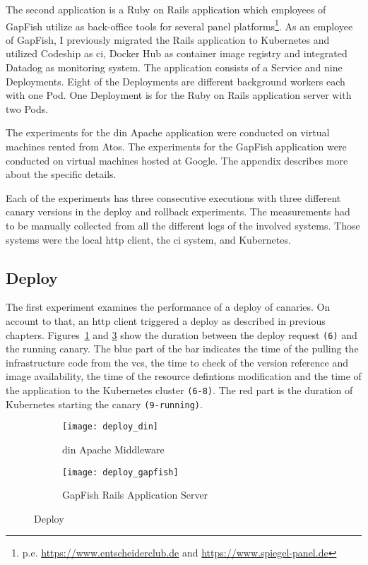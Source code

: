The second application is a Ruby on Rails application which employees of GapFish utilize
as back-office tools for several panel
platforms\footnote{p.e. \url{https://www.entscheiderclub.de} and
  \url{https://www.spiegel-panel.de}}. As an employee of GapFish, I previously migrated the
Rails application to Kubernetes and utilized Codeship as \gls{ci}, Docker Hub as container
image registry and integrated Datadog as monitoring system. The application consists of a
Service and nine Deployments. Eight of the Deployments are different background workers
each with one Pod. One Deployment is for the Ruby on Rails application server with two
Pods.

The experiments for the \gls{din} Apache application were conducted on virtual machines
rented from Atos. The experiments for the GapFish application were conducted on virtual
machines hosted at Google. The appendix describes more about the specific details.

Each of the experiments has three consecutive executions with three different canary
versions in the deploy and rollback experiments. The measurements had to be manually
collected from all the different logs of the involved systems. Those systems were the local \gls{http}
client, the \gls{ci} system, \deployer{} and Kubernetes.

\subsection{Deploy}

The first experiment examines the performance of a deploy of canaries. On account to
that, an \gls{http} client triggered a deploy as described in previous
chapters. Figures~\ref{fig:deploy_din} and \ref{fig:deploy_gapfish} show the duration
between the deploy request \texttt{(6)} and the running canary. The blue part of the bar indicates
the time of the \deployer{} pulling the infrastructure code from the \gls{vcs},
the time to check of the version reference and image availability, the time of the resource defintions modification
and the time of the application to the Kubernetes cluster \texttt{(6-8)}. The red part is the duration
of Kubernetes starting the canary \texttt{(9-running)}.

\begin{figure}[htbp]
  \label{fig:deploy}
  \centering
  \begin{subfigure}{.5\textwidth}
    \texttt{[image: deploy\_din]}
    \caption{\gls{din} Apache Middleware}
    \label{fig:deploy_din}
  \end{subfigure}%
  \begin{subfigure}{.5\textwidth}
    \texttt{[image: deploy\_gapfish]}
    \caption[GapFish]{GapFish Rails Application Server}
    \label{fig:deploy_gapfish}
  \end{subfigure}
  \caption{Deploy}
\end{figure}

